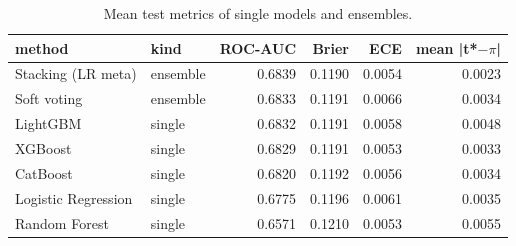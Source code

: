 \begin{table}[t]
\centering
\caption{Mean test metrics of single models and ensembles.}
\label{tab:T12a_ensembles}
\small
\begin{tabular}{llrrrr}
\toprule
method & kind & ROC-AUC & Brier & ECE & mean |t*$-$$\pi$| \\
\midrule
Stacking (LR meta) & ensemble & 0.6839 & 0.1190 & 0.0054 & 0.0023 \\
Soft voting & ensemble & 0.6833 & 0.1191 & 0.0066 & 0.0034 \\
LightGBM & single & 0.6832 & 0.1191 & 0.0058 & 0.0048 \\
XGBoost & single & 0.6829 & 0.1191 & 0.0053 & 0.0033 \\
CatBoost & single & 0.6820 & 0.1192 & 0.0056 & 0.0034 \\
Logistic Regression & single & 0.6775 & 0.1196 & 0.0061 & 0.0035 \\
Random Forest & single & 0.6571 & 0.1210 & 0.0053 & 0.0055 \\
\bottomrule
\end{tabular}
\end{table}

